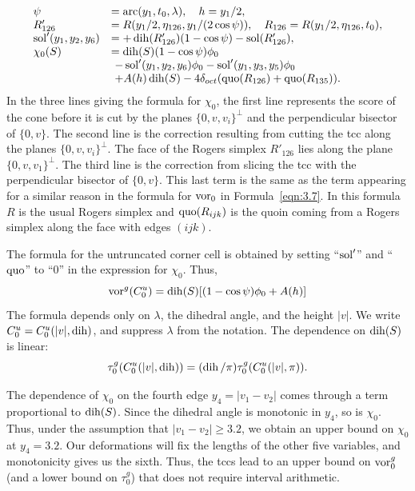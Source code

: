     $$
    \begin{array}{lll}
        \psi &= \operatorname{arc}(y_1,t_0,\lambda),\quad h=y_1/2,\\
        R'_{126}&=R(y_1/2,\eta_{126},y_1/(2\cos\psi)),
        \quad R_{126}=R(y_1/2,\eta_{126},t_0),\\
        \operatorname{sol}'(y_1,y_2,y_6) &= +\operatorname{dih}(R'_{126})(1-\cos\psi)-\operatorname{sol}(R'_{126}),\\
        \chi_0(S) &= \operatorname{dih}(S)(1-\cos\psi)\phi_0\\
            &\ -\operatorname{sol}'(y_1,y_2,y_6)\phi_0 -\operatorname{sol}'(y_1,y_3,y_5)\phi_0\\
            &\ +A(h)\operatorname{dih}(S)-
                4\delta_{oct} (\operatorname{quo}(R_{126})+\operatorname{quo}(R_{135})).
    \end{array}
    $$
In the three lines giving the formula for $\chi_0$, the first line
represents the score of the cone before it is cut by the planes
$\{0,v,v_i\}^\perp$ and the perpendicular bisector of $\{0,v\}$. The second
line is the correction resulting from cutting the tcc along the planes
$\{0,v,v_i\}^\perp$. The face of the Rogers simplex $R'_{126}$ lies along
the plane $\{0,v,v_1\}^\perp$.  The third line is the correction from
slicing the tcc with the perpendicular bisector of $\{0,v\}$.  This last
term is the same as the term appearing for a similar reason in the
formula for $\operatorname{vor}_0$ in Formula~\ref{eqn:3.7}. In this formula $R$ is
the usual Rogers simplex and $\operatorname{quo}(R_{ijk})$ is the quoin coming from a
Rogers simplex along the face with edges $(ijk)$.

The formula for the untruncated corner cell is obtained by setting
``$\operatorname{sol}'$'' and ``$\operatorname{quo}$'' to ``$0$'' in the expression for $\chi_0$.
Thus,
    $$
    \operatorname{vor}^g(C_0^u) = \operatorname{dih}(S)[(1-\cos\psi)\phi_0 + A(h)]
    $$
The formula depends only on $\lambda$, the dihedral angle, and the
height $|v|$.  We write $C_0^u = C_0^u(|v|,\operatorname{dih})$, and suppress
$\lambda$ from the notation. The dependence on $\operatorname{dih}(S)$ is
linear:
    $$
    \tau^g_0(C_0^u(|v|,\operatorname{dih}))= (\operatorname{dih}/\pi)\tau^g_0(C_0^u(|v|,\pi)).
    $$

The dependence of $\chi_0$ on the fourth edge $y_4=|v_1-v_2|$
comes through a term proportional to $\operatorname{dih}(S)$.  Since the
dihedral angle is monotonic in $y_4$, so is $\chi_0$.  Thus, under
the assumption that $|v_1-v_2|\ge3.2$,  we obtain an upper bound
on $\chi_0$ at $y_4=3.2$. Our deformations will fix the lengths of
the other five variables, and monotonicity gives us the sixth.
Thus, the tccs lead to an upper bound on $\operatorname{vor}^g_0$ (and a lower
bound on $\tau^g_0$) that does not require interval arithmetic.


